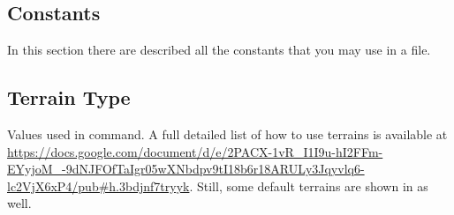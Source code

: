 \begin{appendices}
    \section{Constants}

    In this section there are described all the constants that you may use in a  file.

    \subsection{Terrain Type}
    \label{subsection:terraintype}

    Values used in  command. A full detailed list of how to use terrains is available at \url{https://docs.google.com/document/d/e/2PACX-1vR_I1I9u-hI2FFm-EYyjoM_-9dNJFOfTaIgr05wXNbdpv9tI18b6r18ARULy3Jqyvlq6-lc2VjX6xP4/pub#h.3bdjnf7tryyk}. Still, some default terrains are shown in  as well.


\end{appendices}
